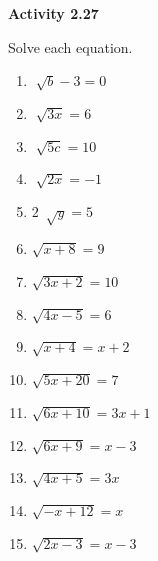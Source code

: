 \vspace{1ex}
\noindent\textbf{Activity 2.27}

\vspace{0.75ex}

Solve each equation. 

\begin{multicols}{2}
\begin{enumerate}[noitemsep, label = \color{blue}\arabic*. ]
    \item \(\sqrt[]{b} - 3 = 0 \)
    \item \(\sqrt[]{3x} = 6 \)
    \item \(\sqrt[]{5c} = 10 \)
    \item \(\sqrt[]{2x} = -1 \)
    \item \(2~\sqrt[]{y} = 5 \)
    \item \( \sqrt{x + 8} = 9 \)
    \item \( \sqrt{3x + 2} = 10 \)
    \item \( \sqrt{4x - 5} = 6 \)
    \item \( \sqrt{x + 4} = x + 2 \)
    \item \( \sqrt{5x + 20} = 7 \)
    \item \( \sqrt{6x + 10} = 3x + 1 \)
    \item \( \sqrt{6x + 9} = x - 3 \)
    \item \( \sqrt{4x + 5} = 3x \)
    \item \( \sqrt{-x + 12} = x \)
    \item \( \sqrt{2x - 3} = x - 3 \)
\end{enumerate}
\end{multicols}

